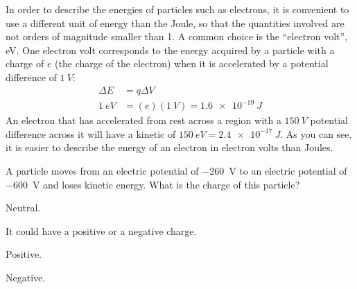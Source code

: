 In order to describe the energies of particles such as electrons, it is convenient to use a different unit of energy than the Joule, so that the quantities involved are not orders of magnitude smaller than 1. A common choice is the ``electron volt'', \si{eV}. One electron volt corresponds to the energy acquired by a particle with a charge of $e$ (the charge of the electron) when it is accelerated by a potential difference of $\SI{1}{V}$:
\begin{align*}
\Delta E &= q\Delta V\\
\SI{1}{eV}&=(e)(\SI{1}{V})=\SI{1.6e-19}{J}
\end{align*}
An electron that has accelerated from rest across a region with a $\SI{150}{V}$ potential difference across it will have a kinetic of $\SI{150}{eV}=\SI{2.4e-17}{J}$. As you can see, it is easier to describe the energy of an electron in electron volts than Joules.

\begin{checkpoint}
	\begin{MCquestion}{A particle moves from an electric potential of \SI{-260}{V} to an electric potential of \SI{-600}{V} and loses kinetic energy. What is the charge of this particle?}
	\item Neutral.
	\item It could have a positive or a negative charge.
	\item Positive.
	\item Negative. \correct
\end{MCquestion}
\end{checkpoint}

